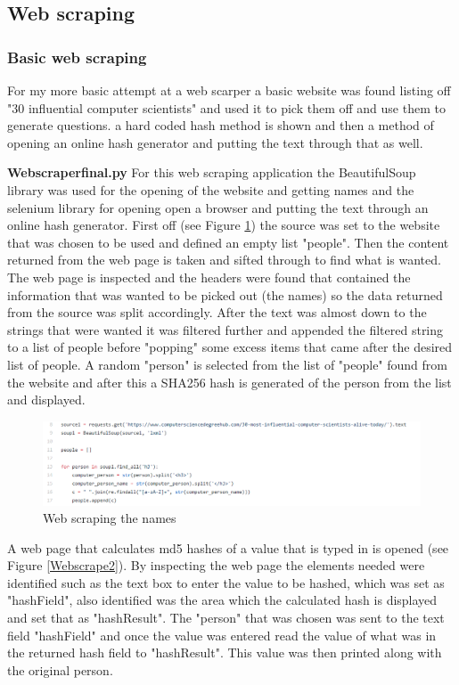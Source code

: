 \documentclass[12pt,a4paper]{article}
\begin{document}
\subsection{Web scraping} 
\subsubsection{Basic web scraping}   
For my more basic attempt at a web scarper a basic website was found listing off "30 influential computer scientists" and used it to pick them off and use them to generate questions. a hard coded hash method is shown and then a method of opening an online hash generator and putting the text through that as well. 

\textbf{Web\textunderscore scraper\textunderscore final.py}  
For this web scraping application the BeautifulSoup library was used for the opening of the website and getting names and the selenium library for opening open a browser and putting the text through an online hash generator. First off (see Figure \ref{Webscrape1}) the source was set to the website that was chosen to be used and defined an empty list "people". Then the content returned from the web page is taken and sifted through to find what is wanted. The web page is inspected and the headers were found that contained the information that was wanted to be picked out (the names) so the data returned from the source was split accordingly. After the text was almost down to the strings that were wanted it was filtered further and appended the filtered string to a list of people before "popping" some excess items that came after the desired list of people. A random "person" is selected from the list of "people" found from the website and after this a SHA256 hash is generated of the person from the list and displayed. 

\begin{figure}[!ht]
    \centering
    \includegraphics[width=1.0\textwidth]{Figs/web_scrape1.PNG} 
    \caption{Web scraping the names} 
    \label{Webscrape1}
\end{figure}  

 A web page that calculates md5 hashes of a value that is typed in is opened (see Figure \ref{Webscrape2}). By inspecting the web page the elements needed were identified such as the text box to enter the value to be hashed, which was set as "hashField", also identified was the area which the calculated hash is displayed and set that as "hashResult". The "person" that was chosen was sent to the text field "hashField" and once the value was entered read the value of what was in the returned hash field to "hashResult". This value was then printed along with the original person.
\end{document}
